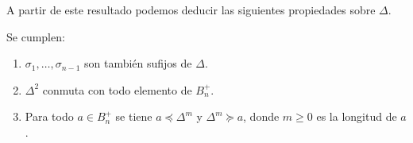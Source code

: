 \documentclass[TFG.tex]{subfiles}
\begin{document}
A partir de este resultado podemos deducir las siguientes propiedades sobre $\Delta$.

\begin{prop}\label{sufijos} Se cumplen:
\begin{enumerate}
\item $\sigma_1,\dots,\sigma_{n-1}$ son también sufijos de $\Delta$.
\item $\Delta^2$ conmuta con todo elemento de $B_n^+$.
\item Para todo $a\in B_n^+$ se tiene $a\preccurlyeq\Delta^m$ y $\Delta^m\succcurlyeq a$, donde  $m\geq 0$ es la longitud de $a$.
\end{enumerate}
\end{prop}
\end{document}
